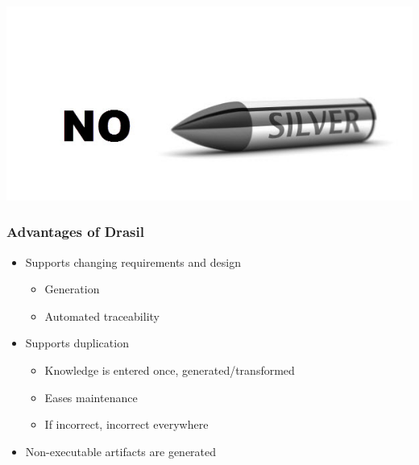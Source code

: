 \documentclass{beamer}
\begin{document}
\begin{frame}
\includegraphics[width=\textwidth]{no_silver_bullet.jpg}
\end{frame}






\begin{frame}

\frametitle{Advantages of Drasil}

\begin{itemize}
\item Supports changing requirements and design
\begin{itemize}
\item Generation
\item Automated traceability
\end{itemize}
\item Supports duplication 
\begin{itemize}
\item Knowledge is entered once, generated/transformed%
\item Eases maintenance
\item If incorrect, incorrect everywhere
\end{itemize}
\item Non-executable artifacts are generated
\end{itemize}
\end{frame}
\end{document}

